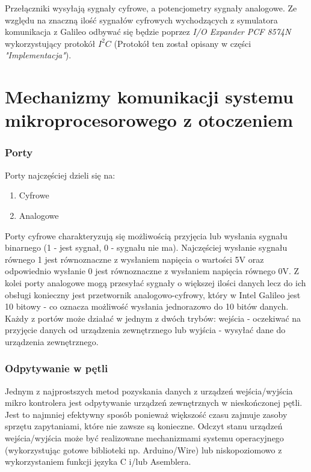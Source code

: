 \documentclass{xmgr}
\begin{document}
Przełączniki wysyłają sygnały cyfrowe, a potencjometry sygnały analogowe. Ze względu na znaczną ilość sygnałów cyfrowych wychodzących z symulatora komunikacja z Galileo odbywać się będzie poprzez \emph{I/O Expander PCF 8574N} wykorzystujący protokół  $I^2C$ (Protokół ten został opisany w części \emph{"Implementacja"}).

\chapter{Mechanizmy komunikacji systemu mikroprocesorowego z otoczeniem}
\subsection{Porty}
Porty najczęściej dzieli się na:
\begin{enumerate}
	\item Cyfrowe
	\item Analogowe
\end{enumerate}

Porty cyfrowe charakteryzują się możliwością przyjęcia lub wysłania sygnału binarnego (1 - jest sygnał, 0 - sygnału nie ma). Najczęściej wysłanie sygnału równego 1 jest równoznaczne z wysłaniem napięcia o wartości 5V oraz odpowiednio wysłanie 0 jest równoznaczne z wysłaniem napięcia równego 0V. Z kolei porty analogowe mogą przesyłać sygnały o większej ilości danych lecz do ich obsługi konieczny jest przetwornik analogowo-cyfrowy, który w Intel Galileo jest 10 bitowy - co oznacza możliwość wysłania jednorazowo do 10 bitów danych. Każdy z portów może działać w jednym  z dwóch trybów: wejścia - oczekiwać na przyjęcie danych od urządzenia zewnętrznego lub wyjścia - wysyłać dane do urządzenia zewnętrznego.

\subsection{Odpytywanie w pętli}
Jednym z najprostszych metod pozyskania danych z urządzeń wejścia/wyjścia mikro kontrolera jest odpytywanie urządzeń zewnętrznych w nieskończonej pętli. Jest to najmniej efektywny sposób ponieważ większość czasu zajmuje zasoby sprzętu zapytaniami, które nie zawsze są konieczne. Odczyt stanu urządzeń wejścia/wyjścia może być realizowane mechanizmami systemu operacyjnego (wykorzystując gotowe biblioteki np. Arduino/Wire) lub niskopoziomowo z wykorzystaniem funkcji języka C i/lub Asemblera.
\end{document}
